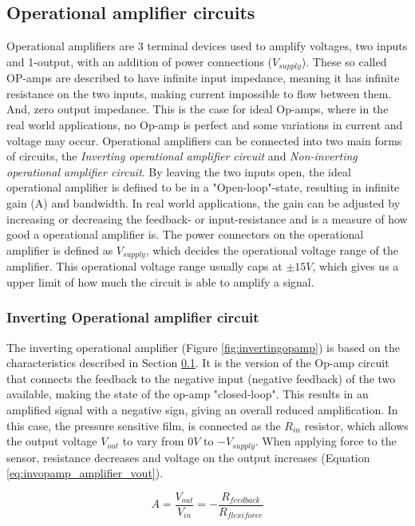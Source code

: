 \subsection{Operational amplifier circuits}
\label{subsec:opamps}
Operational amplifiers are 3 terminal devices used to amplify voltages, two inputs and 1-output, with an addition of power connections ($V_{supply}$). These so called OP-amps are described to have infinite input impedance, meaning it has infinite resistance on the two inputs, making current impossible to flow between them. And, zero output impedance. This is the case for ideal Op-amps, where in the real world applications, no Op-amp is perfect and some variations in current and voltage may occur. Operational amplifiers can be connected into two main forms of circuits, the \textit{Inverting operational amplifier circuit} and \textit{Non-inverting operational amplifier circuit}. By leaving the two inputs open, the ideal operational amplifier is defined to be in a "Open-loop"-state, resulting in infinite gain (A) and bandwidth. In real world applications, the gain can be adjusted by increasing or decreasing the feedback- or input-resistance and is a measure of how good a operational amplifier is. The power connectors on the operational amplifier is defined as $V_{supply}$, which decides the operational voltage range of the amplifier. This operational voltage range usually caps at $\pm 15V$, which gives us a upper limit of how much the circuit is able to amplify a signal.

\subsubsection{Inverting Operational amplifier circuit}
The inverting operational amplifier (Figure \ref{fig:invertingopamp}) is based on the characteristics described in Section \ref{subsec:opamps}. It is the version of the Op-amp circuit that connects the feedback to the negative input (negative feedback) of the two available, making the state of the op-amp "closed-loop". This results in an amplified signal with a negative sign, giving an overall reduced amplification. In this case, the pressure sensitive film, is connected as the $R_{in}$ resistor, which allows the output voltage $V_{out}$ to vary from $0V$ to $-V_{supply}$. When applying force to the sensor, resistance decreases and voltage on the output increases (Equation \ref{eq:invopamp_amplifier_vout}).

\begin{equation}
\label{eq:invopamp_amplifier}
    A = \frac{V_{out}}{V_{in}} = - \frac{R_{feedback}}{R_{flexiforce}}
\end{equation}

